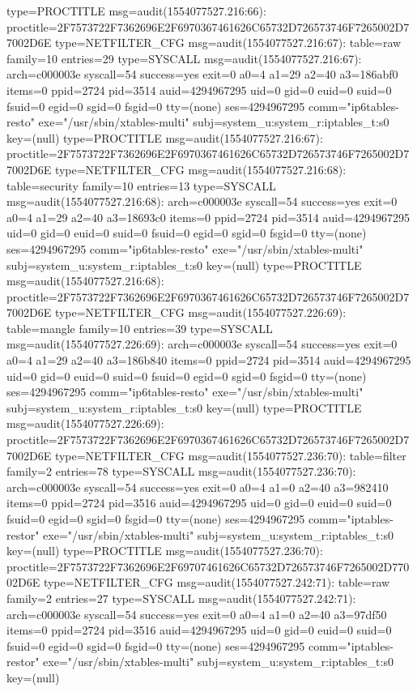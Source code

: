 \documentclass[]{report}
\newenvironment{Shaded}{}{}
\newcommand{\NormalTok}[1]{#1}
\begin{document}
\begin{Shaded}
\begin{Highlighting}[]
\NormalTok{type=PROCTITLE msg=audit(1554077527.216:66): proctitle=2F7573722F7362696E2F6970367461626C65732D726573746F7265002D77002D6E}
\NormalTok{type=NETFILTER_CFG msg=audit(1554077527.216:67): table=raw family=10 entries=29}
\NormalTok{type=SYSCALL msg=audit(1554077527.216:67): arch=c000003e syscall=54 success=yes exit=0 a0=4 a1=29 a2=40 a3=186abf0 items=0 ppid=2724 pid=3514 auid=4294967295 uid=0 gid=0 euid=0 suid=0 fsuid=0 egid=0 sgid=0 fsgid=0 tty=(none) ses=4294967295 comm="ip6tables-resto" exe="/usr/sbin/xtables-multi" subj=system_u:system_r:iptables_t:s0 key=(null)}
\NormalTok{type=PROCTITLE msg=audit(1554077527.216:67): proctitle=2F7573722F7362696E2F6970367461626C65732D726573746F7265002D77002D6E}
\NormalTok{type=NETFILTER_CFG msg=audit(1554077527.216:68): table=security family=10 entries=13}
\NormalTok{type=SYSCALL msg=audit(1554077527.216:68): arch=c000003e syscall=54 success=yes exit=0 a0=4 a1=29 a2=40 a3=18693c0 items=0 ppid=2724 pid=3514 auid=4294967295 uid=0 gid=0 euid=0 suid=0 fsuid=0 egid=0 sgid=0 fsgid=0 tty=(none) ses=4294967295 comm="ip6tables-resto" exe="/usr/sbin/xtables-multi" subj=system_u:system_r:iptables_t:s0 key=(null)}
\NormalTok{type=PROCTITLE msg=audit(1554077527.216:68): proctitle=2F7573722F7362696E2F6970367461626C65732D726573746F7265002D77002D6E}
\NormalTok{type=NETFILTER_CFG msg=audit(1554077527.226:69): table=mangle family=10 entries=39}
\NormalTok{type=SYSCALL msg=audit(1554077527.226:69): arch=c000003e syscall=54 success=yes exit=0 a0=4 a1=29 a2=40 a3=186b840 items=0 ppid=2724 pid=3514 auid=4294967295 uid=0 gid=0 euid=0 suid=0 fsuid=0 egid=0 sgid=0 fsgid=0 tty=(none) ses=4294967295 comm="ip6tables-resto" exe="/usr/sbin/xtables-multi" subj=system_u:system_r:iptables_t:s0 key=(null)}
\NormalTok{type=PROCTITLE msg=audit(1554077527.226:69): proctitle=2F7573722F7362696E2F6970367461626C65732D726573746F7265002D77002D6E}
\NormalTok{type=NETFILTER_CFG msg=audit(1554077527.236:70): table=filter family=2 entries=78}
\NormalTok{type=SYSCALL msg=audit(1554077527.236:70): arch=c000003e syscall=54 success=yes exit=0 a0=4 a1=0 a2=40 a3=982410 items=0 ppid=2724 pid=3516 auid=4294967295 uid=0 gid=0 euid=0 suid=0 fsuid=0 egid=0 sgid=0 fsgid=0 tty=(none) ses=4294967295 comm="iptables-restor" exe="/usr/sbin/xtables-multi" subj=system_u:system_r:iptables_t:s0 key=(null)}
\NormalTok{type=PROCTITLE msg=audit(1554077527.236:70): proctitle=2F7573722F7362696E2F69707461626C65732D726573746F7265002D77002D6E}
\NormalTok{type=NETFILTER_CFG msg=audit(1554077527.242:71): table=raw family=2 entries=27}
\NormalTok{type=SYSCALL msg=audit(1554077527.242:71): arch=c000003e syscall=54 success=yes exit=0 a0=4 a1=0 a2=40 a3=97df50 items=0 ppid=2724 pid=3516 auid=4294967295 uid=0 gid=0 euid=0 suid=0 fsuid=0 egid=0 sgid=0 fsgid=0 tty=(none) ses=4294967295 comm="iptables-restor" exe="/usr/sbin/xtables-multi" subj=system_u:system_r:iptables_t:s0 key=(null)}

\end{Highlighting}
\end{Shaded}
\end{document}
